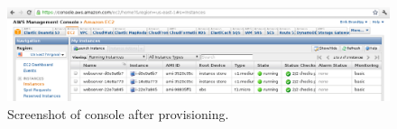 \begin{figure}[tb]
  \includegraphics[width=\linewidth]{imgs/aws-console.png}
  \caption{Screenshot of  console after provisioning.}
  \label{fig:validation-aws}
\end{figure}

